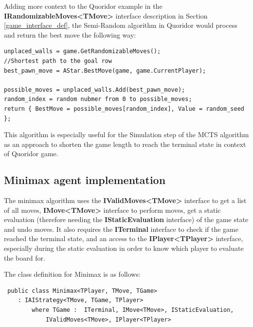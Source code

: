 Adding more context to the Quoridor example in the \textbf{IRandomizableMoves\textless{}TMove\textgreater{}} interface description in Section \ref{game_interface_def}, the Semi-Random algorithm in Quoridor would process and return the best move the following way:

\begin{lstlisting}
unplaced_walls = game.GetRandomizableMoves();
//Shortest path to the goal row
best_pawn_move = AStar.BestMove(game, game.CurrentPlayer);

possible_moves = unplaced_walls.Add(best_pawn_move);
random_index = random nubmer from 0 to possible_moves;
return { BestMove = possible_moves[random_index], Value = random_seed };
\end{lstlisting}

This algorithm is especially useful for the Simulation step of the \gls{MCTS} algorithm as an approach to shorten the game length to reach the terminal state in context of Quoridor game.

\subsection{Minimax agent implementation}

The minimax algorithm uses the \textbf{IValidMoves\textless{}TMove\textgreater{}} interface to get a list of all moves, \textbf{IMove\textless{}TMove\textgreater{}} interface to perform moves, get a static evaluation (therefore needing the \textbf{IStaticEvaluation} interface) of the game state and undo moves. It also requires the \textbf{ITerminal} interface to check if the game reached the terminal state, and an access to the \textbf{IPlayer\textless{}TPlayer\textgreater{}} interface, especially during the static evaluation in order to know which player to evaluate the board for.

The class definition for Minimax is as follows:

\begin{lstlisting}
 public class Minimax<TPlayer, TMove, TGame>
    : IAIStrategy<TMove, TGame, TPlayer>
        where TGame :  ITerminal, IMove<TMove>, IStaticEvaluation,
            IValidMoves<TMove>, IPlayer<TPlayer>
\end{lstlisting}

